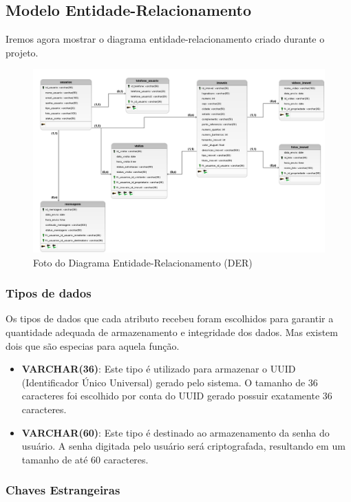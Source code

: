 \subsection{Modelo Entidade-Relacionamento}

Iremos agora mostrar o diagrama entidade-relacionamento criado durante o projeto.
\newpage
\begin{figure}[h!] 
    \centering
    \includegraphics[width=\textwidth]{./img/Logico.png}
    \caption{Foto do Diagrama Entidade-Relacionamento (DER)}
    \label{fig:exemplo-imagem}
\end{figure}
\subsubsection{Tipos de dados}

Os tipos de dados que cada atributo recebeu foram escolhidos para garantir a quantidade adequada de armazenamento e integridade dos dados. Mas existem dois que são especias para aquela função.

\begin{itemize} 
    \item \textbf{VARCHAR(36)}: Este tipo é utilizado para armazenar o UUID (Identificador Único Universal) gerado pelo sistema. O tamanho de 36 caracteres foi escolhido por conta do UUID gerado possuir exatamente 36 caracteres.
    \item \textbf{VARCHAR(60)}: Este tipo é destinado ao armazenamento da senha do usuário. A senha digitada pelo usuário será criptografada, resultando em um tamanho de até 60 caracteres. 


\end{itemize}


\subsubsection{Chaves Estrangeiras}

